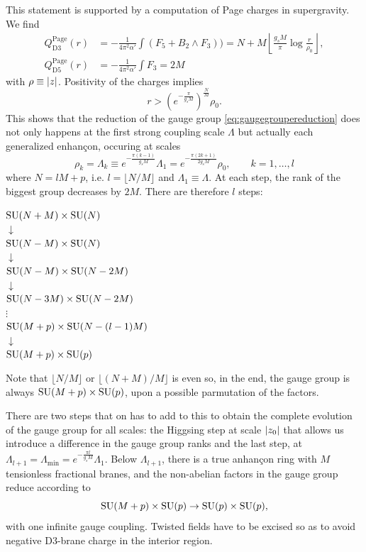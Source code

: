     This statement is supported by a computation of Page charges in supergravity. We find
    \begin{align}
        Q^{\text{Page}}_{\text{D3}}(r) &= -\frac{1}{4\pi^2\alpha'}\int (F_5+B_2\wedge F_3))=N+M\left\lfloor\frac{g_sM}{\pi}\log\frac{r}{\rho_0}\right\rfloor,\\
        Q^{\text{Page}}_{\text{D5}}(r) &= -\frac{1}{4\pi^2\alpha'}\int F_3=2M
    \end{align}
    with $\rho\equiv\abs{z}$. Positivity of the charges implies
    \begin{equation}
        r>(e^{-\frac{\pi}{g_sM}})^{\frac{N}{M}}\rho_0.
    \end{equation}
    This shows that the reduction of the gauge group \eqref{eq:gaugegroupereduction} does not only happens at the first strong coupling scale $\Lambda$ but actually each generalized enhançon, occuring at scales
    \begin{equation}
        \rho_k=\Lambda_k\equiv e^{-\frac{\pi(k-1)}{g_sM}}\Lambda_1 = e^{-\frac{\pi(2k+1)}{2g_sM}}\rho_0, \qquad k=1,\dots,l
    \end{equation}
    where $N=lM+p$, i.e. $l=\lfloor N/M\rfloor$ and $\Lambda_1\equiv\Lambda$. At each step, the rank of the biggest group decreases by $2M$. There are therefore $l$ steps:
    \begin{center}
        $\text{SU}(N+M)\times\text{SU}(N)$\\
        $\downarrow$\\
        $\text{SU}(N-M)\times\text{SU}(N)$\\
        $\downarrow$\\
        $\text{SU}(N-M)\times\text{SU}(N-2M)$\\
        $\downarrow$\\
        $\text{SU}(N-3M)\times\text{SU}(N-2M)$\\
        $\vdots$\\
        $\text{SU}(M+p)\times\text{SU}(N-(l-1)M)$\\
        $\downarrow$\\
        $\text{SU}(M+p)\times\text{SU}(p)$\\
    \end{center}
    Note that $\lfloor N/M\rfloor$ or $\lfloor(N+M)/M\rfloor$ is even so, in the end, the gauge group is always $\text{SU}(M+p)\times\text{SU}(p)$, upon a possible parmutation of the factors.

    There are two steps that on has to add to this to obtain the complete evolution of the gauge group for all scales: the Higgsing step at scale $\abs{z_0}$ that allows us introduce a difference in the gauge group ranks and the last step, at $\Lambda_{l+1}=\Lambda_{\text{min}}=e^{-\frac{\pi l}{g_s M}}\Lambda_1$. Below $\Lambda_{l+1}$, there is a true anhançon ring with $M$ tensionless fractional branes, and the non-abelian factors in the gauge group reduce according to
    \begin{equation}
        \text{SU}(M+p)\times\text{SU}(p)\to\text{SU}(p)\times\text{SU}(p),
    \end{equation}
    with one infinite gauge coupling. Twisted fields have to be excised so as to avoid negative D$3$-brane charge in the interior region.

